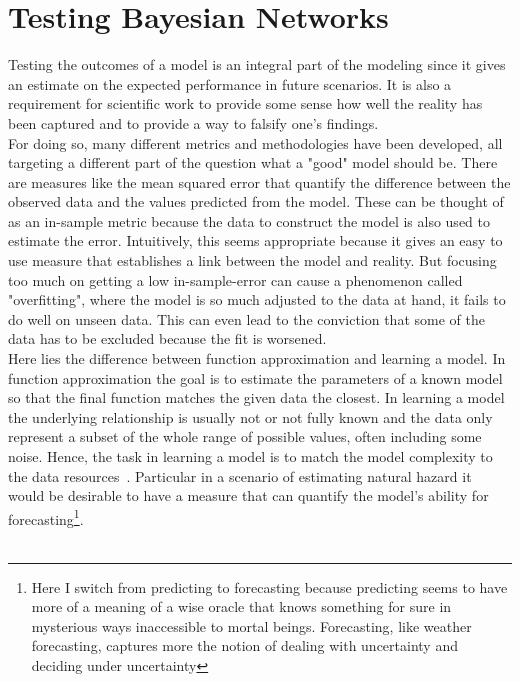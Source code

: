 
\chapter{Testing Bayesian Networks} %

\label{Chapter3} %


Testing the outcomes of a model is an integral part of the modeling since it gives an estimate on the expected performance in future scenarios. It is also a requirement for scientific work to provide some sense how well the reality has been captured and to provide a way to falsify one's findings.\\
For doing so, many different metrics and methodologies have been developed, all targeting a different part of the question what a "good" model should be. There are measures like the mean squared error that quantify the difference between the observed data and the values predicted from the model. These can be thought of as an in-sample  metric because the data to construct the model is also used to estimate the error. Intuitively, this seems appropriate because it gives an easy to use measure that establishes a link between the model and reality. But focusing too much on getting a low in-sample-error can cause a phenomenon called "overfitting", where the model is so much adjusted to the data at hand, it fails to do well on unseen data. This can even lead to the conviction that some of the data has to be excluded because the fit is worsened.\\
Here lies the difference between function approximation and learning a model. In function approximation the goal is to estimate the parameters of a known model so that the final function matches the given data the closest. In learning a model the underlying relationship is usually not or not fully known and the data only represent a subset of the whole range of possible values, often including some noise. Hence, the task in learning a model is to match the model complexity to the data resources~\citep{LearningFromData}. Particular in a scenario of estimating natural hazard it would be desirable to have a measure that can quantify the model's ability for forecasting\footnote{Here I switch from predicting to forecasting because predicting seems to have more of a meaning of a wise oracle that knows something for sure in mysterious ways inaccessible to mortal beings. Forecasting, like weather forecasting, captures more the notion of dealing with uncertainty and deciding under uncertainty}.\\\\
